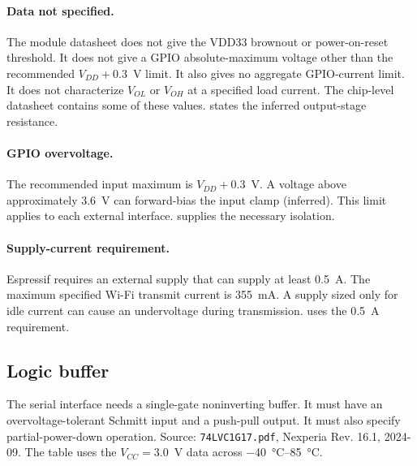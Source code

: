 \paragraph{Data not specified.} The module datasheet does not give the VDD33
brownout or power-on-reset threshold. It does not give a GPIO absolute-maximum
voltage other than the recommended \(V_{DD}+0.3\)~V limit. It also gives no
aggregate GPIO-current limit. It does not characterize \(V_{OL}\) or \(V_{OH}\)
at a specified load current. The chip-level datasheet contains some of these
values.  states the inferred output-stage resistance.

\paragraph{GPIO overvoltage.} The recommended input maximum is
\(V_{DD}+0.3\)~V. A voltage above approximately \SI{3.6}{\volt} can forward-bias
the input clamp (inferred). This limit applies to each external interface.
 supplies the necessary isolation.

\paragraph{Supply-current requirement.} Espressif requires an external supply
that can supply at least \SI{0.5}{\ampere}. The maximum specified Wi-Fi transmit
current is \SI{355}{\milli\ampere}. A supply sized only for idle current can
cause an undervoltage during transmission.  uses the
\SI{0.5}{\ampere} requirement.

\subsection{Logic buffer}
\label{sec:lvc1g17}

The serial interface needs a single-gate noninverting buffer. It must have an
overvoltage-tolerant Schmitt input and a push-pull output. It must also specify
partial-power-down operation. Source: \texttt{74LVC1G17.pdf}, Nexperia Rev.
16.1, 2024-09. The table uses the \(V_{CC}=3.0\)~V data across
\SIrange{-40}{85}{\celsius}.

